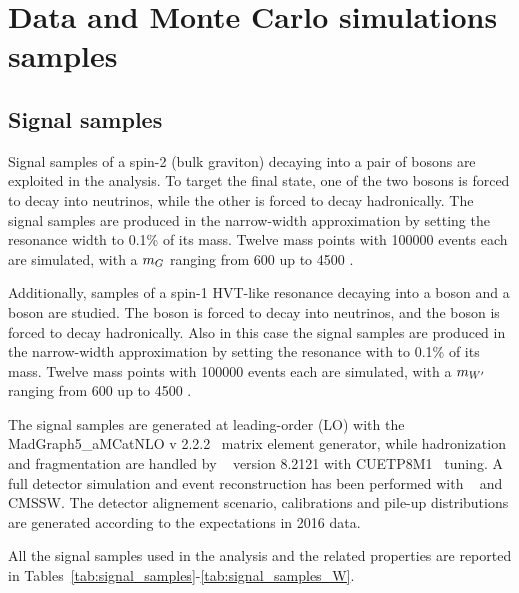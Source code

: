 \section{Data and Monte Carlo simulations samples}
\label{sec:samples}

\subsection{Signal samples}

Signal samples of a spin-2 (bulk graviton) decaying into a pair of \Z bosons are exploited in the analysis. To target the final state, one of the two \Z bosons is forced to decay into neutrinos, while the other \Z is forced to decay hadronically. The signal samples are produced in the narrow-width approximation by setting the resonance width to 0.1\% of its mass. Twelve mass points with 100000 events each are simulated, with a $m_{G}$ ranging from 600 \GeV up to 4500 \GeV.

\noindent Additionally, samples of a spin-1 HVT-like \Wp resonance decaying into a \Z boson and a \W boson are studied. The \Z boson is forced to decay into neutrinos, and the \W boson is forced to decay hadronically. Also in this case the signal samples are produced in the narrow-width approximation by setting the resonance with to 0.1\% of its mass. Twelve mass points with 100000 events each are simulated, with a $m_{W'}$ ranging from 600 \GeV up to 4500 \GeV.

\noindent The signal samples are generated at leading-order (LO) with the {\sc MadGraph5\_aMCatNLO v 2.2.2}~\cite{bib:MADGRAPH} matrix element generator, while hadronization and fragmentation are handled by ~\cite{bib:PYTHIA} version 8.2121 with CUETP8M1~\cite{bib:CUETP8M1} tuning. A full detector simulation and event reconstruction has been performed with \GEANTfour~\cite{bib:GEANT4} and CMSSW. The detector alignement scenario, calibrations and pile-up distributions are generated according to the expectations in 2016 data.

\noindent All the signal samples used in the analysis and the related properties are reported in Tables~\ref{tab:signal_samples}-\ref{tab:signal_samples_W}.
 
